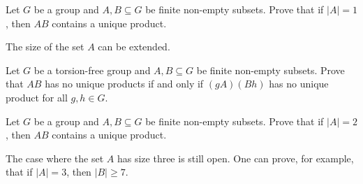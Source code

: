\begin{exercise}
    Let $G$ be a group and $A,B\subseteq G$ be finite non-empty subsets. Prove that 
    if $|A|=1$, then $AB$ contains a unique product. 
\end{exercise}

The size of the set $A$ can be extended. 

\begin{exercise}
    Let $G$ be a torsion-free group and $A,B\subseteq G$ be finite non-empty subsets. Prove that
    $AB$ has no unique products if and only if $(gA)(Bh)$ has no unique product for all $g,h\in G$. 
\end{exercise}

\begin{exercise}
    Let $G$ be a group and $A,B\subseteq G$ be finite non-empty subsets. Prove that 
    if $|A|=2$, then $AB$ contains a unique product. 
\end{exercise}

The case where the set $A$ has size three is still open. One can prove, for example, 
that if $|A|=3$, then $|B|\geq7$. 





